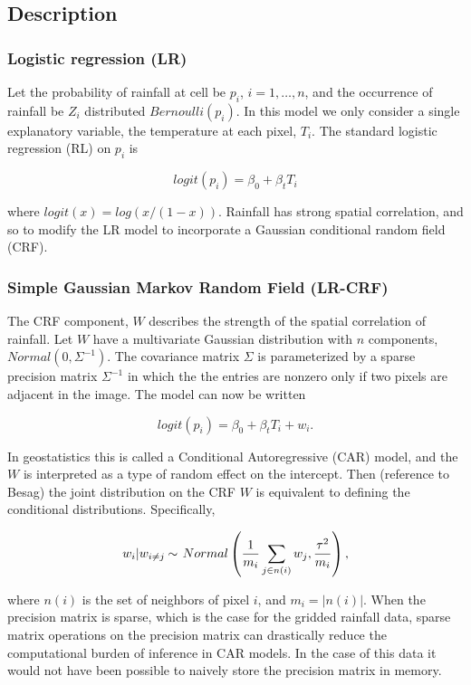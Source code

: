 \subsection{Description}

\subsubsection{Logistic regression (LR)}

Let the probability of rainfall at cell be $p_i$, $i=1,\ldots,n$, and the occurrence of rainfall be $Z_i$ distributed $Bernoulli(p_i)$. In this model we only consider a single explanatory variable, the temperature at each pixel, $T_i$. The standard logistic regression (RL) on $p_i$ is

$$
logit(p_i) = \beta_0 + \beta_t  T_i
$$

where $logit(x)=log(x/(1-x))$. Rainfall has strong spatial correlation, and so to modify the LR model to incorporate a Gaussian conditional random field (CRF). 

\subsubsection{Simple Gaussian Markov Random Field (LR-CRF)}

The CRF component, $W$ describes the strength of the spatial correlation of rainfall. Let $W$ have a multivariate Gaussian distribution with $n$ components, $Normal(0, \Sigma^{-1})$. The covariance matrix $\Sigma$ is parameterized by a sparse precision matrix $\Sigma^{-1}$ in which the the entries are nonzero only if two pixels are adjacent in the image. The model can now be written

$$
logit(p_i) = \beta_0 + \beta_t T_i + w_i.
$$

In geostatistics this is called a Conditional Autoregressive (CAR) model, and the $W$ is interpreted as a type of random effect on the intercept. Then (reference to Besag) the joint distribution on the CRF $W$ is equivalent to defining the conditional distributions. Specifically,

$$
w_i | w_{i \neq j} \distas{} \, Normal\left( \frac{1}{m_i} \sum_{j \in n(i)} w_j, \frac{\tau^2}{m_i} \right),
$$

where $n(i)$ is the set of neighbors of pixel $i$, and $m_i=|n(i)|$. When the precision matrix is sparse, which is the case for the gridded rainfall data, sparse matrix operations on the precision matrix can drastically reduce the computational burden of inference in CAR models. In the case of this data it would not have been possible to naively store the precision matrix in memory.

